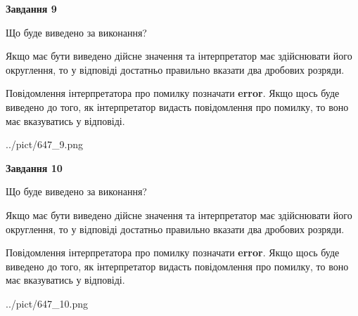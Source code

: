 \documentclass[12pt, ukrainian]{article}
\begin{document}
{\begin {Large}
{\begin {center}\textbf{Завдання 9}\end {center}}\par
Що буде виведено за виконання? \par

Якщо має бути виведено дійсне значення та інтерпретатор має здійснювати його округлення, 
то у відповіді достатньо правильно вказати два дробових розряди.

Повідомлення інтерпретатора про помилку позначати \textbf{error}.
Якщо щось буде виведено до того, як інтерпретатор видасть повідомлення про помилку, 
то воно має вказуватись у відповіді. \par

\begin{center}
	{../pict/647_9.png}
\end{center}
\newpage

{\begin {center}\textbf{Завдання 10}\end {center}}\par
Що буде виведено за виконання? \par

Якщо має бути виведено дійсне значення та інтерпретатор має здійснювати його округлення, 
то у відповіді достатньо правильно вказати два дробових розряди.

Повідомлення інтерпретатора про помилку позначати \textbf{error}.
Якщо щось буде виведено до того, як інтерпретатор видасть повідомлення про помилку, 
то воно має вказуватись у відповіді. \par

\begin{center}
	{../pict/647_10.png}
\end{center}
\newpage

\end {Large}}
\end{document}
